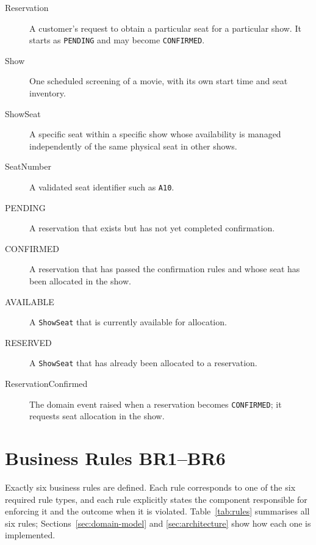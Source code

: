 \documentclass[11pt,a4paper]{article}
\newcommand{\code}[1]{\texttt{#1}}
\begin{document}
\begin{description}
  \item[Reservation] A customer's request to obtain a particular seat for a
        particular show. It starts as \code{PENDING} and may become
        \code{CONFIRMED}.
  \item[Show] One scheduled screening of a movie, with its own start time and
        seat inventory.
  \item[ShowSeat] A specific seat within a specific show whose availability is
        managed independently of the same physical seat in other shows.
  \item[SeatNumber] A validated seat identifier such as \code{A10}.
  \item[PENDING] A reservation that exists but has not yet completed
        confirmation.
  \item[CONFIRMED] A reservation that has passed the confirmation rules and
        whose seat has been allocated in the show.
  \item[AVAILABLE] A \code{ShowSeat} that is currently available for
        allocation.
  \item[RESERVED] A \code{ShowSeat} that has already been allocated to a
        reservation.
  \item[ReservationConfirmed] The domain event raised when a reservation
        becomes \code{CONFIRMED}; it requests seat allocation in the show.
\end{description}

\section{Business Rules BR1--BR6}

Exactly six business rules are defined. Each rule corresponds to one of the six
required rule types, and each rule explicitly states the component responsible
for enforcing it and the outcome when it is violated. Table~\ref{tab:rules}
summarises all six rules; Sections~\ref{sec:domain-model} and
\ref{sec:architecture} show how each one is implemented.
\end{document}
